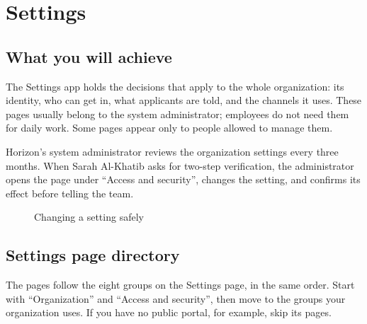 \chapter{Settings}
\label{ch:settings}

\section{What you will achieve}

The Settings app holds the decisions that apply to the whole organization: its identity, who can get in, what applicants are told, and the channels it uses. These pages usually belong to the system administrator; employees do not need them for daily work. Some pages appear only to people allowed to manage them.

\begin{rcnote}
Horizon’s system administrator reviews the organization settings every three months. When Sarah Al-Khatib asks for two-step verification, the administrator opens the page under “Access and security”, changes the setting, and confirms its effect before telling the team.
\end{rcnote}

\begin{figure}[H]
\centering
{}
\rclegend
\caption{Changing a setting safely}
\label{fig:settings-change-flow}
\end{figure}

\section{Settings page directory}
\label{sec:settings-pages}
The pages follow the eight groups on the Settings page, in the same order. Start with “Organization” and “Access and security”, then move to the groups your organization uses. If you have no public portal, for example, skip its pages.

